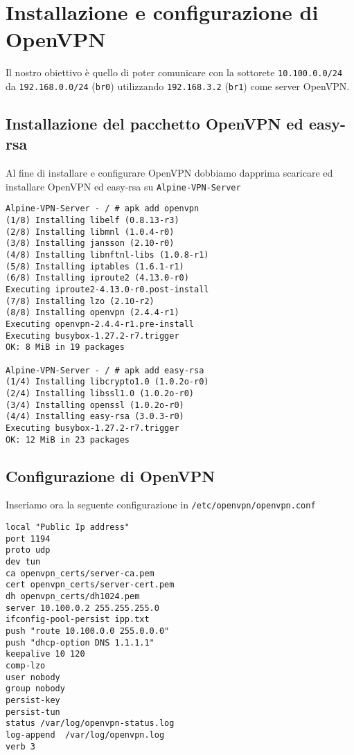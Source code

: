 \documentclass{article}
\newcommand{\interface}[1]{{\lstinline[basicstyle=\ttfamily\color{brown}]|#1|}}
\newcommand{\ipaddress}[1]{{\lstinline[basicstyle=\ttfamily\color{purple}]|#1|}}
\newcommand{\hostname}[1]{{\lstinline[basicstyle=\ttfamily\color{teal}]|#1|}}
\newcommand{\path}[1]{{\lstinline[basicstyle=\ttfamily\color{blue}]|#1|}}
\begin{document}
\section{Installazione e configurazione di OpenVPN}
Il nostro obiettivo è quello di poter comunicare con la sottorete \ipaddress{10.100.0.0/24} da
\ipaddress{192.168.0.0/24} (\interface{br0}) utilizzando \ipaddress{192.168.3.2} (\interface{br1})
come server OpenVPN.

\subsection{Installazione del pacchetto OpenVPN ed easy-rsa}
Al fine di installare e configurare OpenVPN dobbiamo dapprima scaricare ed installare 
OpenVPN ed easy-rsa su \hostname{Alpine-VPN-Server}

\begin{lstlisting}
Alpine-VPN-Server - / # apk add openvpn
(1/8) Installing libelf (0.8.13-r3)
(2/8) Installing libmnl (1.0.4-r0)
(3/8) Installing jansson (2.10-r0)
(4/8) Installing libnftnl-libs (1.0.8-r1)
(5/8) Installing iptables (1.6.1-r1)
(6/8) Installing iproute2 (4.13.0-r0)
Executing iproute2-4.13.0-r0.post-install
(7/8) Installing lzo (2.10-r2)
(8/8) Installing openvpn (2.4.4-r1)
Executing openvpn-2.4.4-r1.pre-install
Executing busybox-1.27.2-r7.trigger
OK: 8 MiB in 19 packages

Alpine-VPN-Server - / # apk add easy-rsa
(1/4) Installing libcrypto1.0 (1.0.2o-r0)
(2/4) Installing libssl1.0 (1.0.2o-r0)
(3/4) Installing openssl (1.0.2o-r0)
(4/4) Installing easy-rsa (3.0.3-r0)
Executing busybox-1.27.2-r7.trigger
OK: 12 MiB in 23 packages
\end{lstlisting}


\subsection{Configurazione di OpenVPN}
Inseriamo ora la seguente configurazione in \path{/etc/openvpn/openvpn.conf}
\begin{lstlisting}
local "Public Ip address"
port 1194
proto udp
dev tun
ca openvpn_certs/server-ca.pem
cert openvpn_certs/server-cert.pem
dh openvpn_certs/dh1024.pem
server 10.100.0.2 255.255.255.0
ifconfig-pool-persist ipp.txt
push "route 10.100.0.0 255.0.0.0"
push "dhcp-option DNS 1.1.1.1"
keepalive 10 120
comp-lzo
user nobody
group nobody
persist-key
persist-tun
status /var/log/openvpn-status.log
log-append  /var/log/openvpn.log
verb 3
\end{lstlisting}
\end{document}
